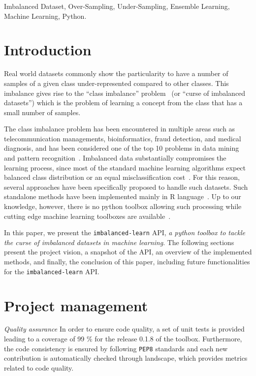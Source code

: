 \documentclass[twoside,11pt]{article}
\begin{document}
\begin{keywords}
Imbalanced Dataset, Over-Sampling, Under-Sampling, Ensemble Learning, Machine Learning, Python.
\end{keywords}

\section{Introduction}

Real world datasets commonly show the particularity to have a number of samples of a given class under-represented compared to other classes.
This imbalance gives rise to the ``class imbalance'' problem~\citep{prati2009data} (or ``curse of imbalanced datasets'')
which is the problem of learning a concept from the class that has a small number of samples.

The class imbalance problem has been encountered in multiple areas such as 
telecommunication managements, bioinformatics, fraud detection, and medical diagnosis,
and has been considered one of the top 10 problems in data mining and 
pattern recognition~\citep{yang200610,rastgoo2016tackling}. 
Imbalanced data substantially compromises the learning process, since most of the 
standard machine learning algorithms expect balanced class distribution or an 
equal misclassification cost~\citep{he2009learning}. For this reason, several
approaches have been specifically proposed to handle such datasets.
Such standalone methods have been implemented mainly in R language~\citep{torgo2010data,kuhn2015caret,dal2013racing}.
Up to our knowledge, however, there is no python toolbox allowing such processing while cutting edge machine learning toolboxes are available~\citep{pedregosa2011scikit,sonnenburg2010shogun}.

In this paper, we present the \texttt{imbalanced-learn} API, 
\textit{a python toolbox to tackle the curse of imbalanced datasets
in machine learning}. The following sections present the project vision, a snapshot of the API, an overview of the implemented methods,
and finally, the conclusion of this paper, including future functionalities
for the \texttt{imbalanced-learn} API.

\section{Project management}

\noindent\textit{Quality assurance} In order to ensure code quality, a set of unit tests is provided leading to a coverage of 99 \% for the release 0.1.8 of the toolbox.
Furthermore, the code consistency is ensured by following \texttt{PEP8} standards and each new contribution is automatically checked through landscape, which provides metrics related to code quality.
\end{document}
